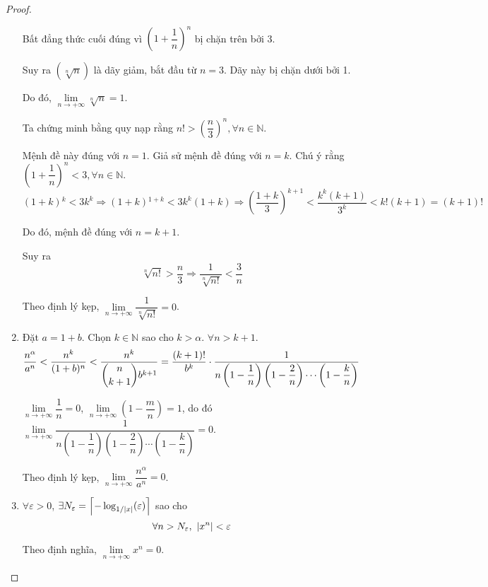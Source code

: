 \documentclass[class=analysis,crop=false]{standalone}
\begin{document}
\begin{proof}
\begin{enumerate}[label = (\roman*)]
            \par Bất đẳng thức cuối đúng vì $\left(1+\dfrac{1}{n}\right)^{n}$ bị chặn trên bởi 3.
            \par Suy ra $(\sqrt[n]{n})$ là dãy giảm, bắt đầu từ $n = 3$. Dãy này bị chặn dưới bởi 1.
            \par Do đó, $\lim\limits_{n\to+\infty}\sqrt[n]{n} = 1$.
            \bigskip
            \par Ta chứng minh bằng quy nạp rằng $n! > \left(\dfrac{n}{3}\right)^{n}, \forall n\in\mathbb{N}$.
            \par Mệnh đề này đúng với $n = 1$. Giả sử mệnh đề đúng với $n = k$. Chú ý rằng $\left(1 + \dfrac{1}{n}\right)^{n} < 3, \forall n\in\mathbb{N}$.
            \[
                (1 + k){}^{k} < 3k^{k}\Rightarrow (1 + k){}^{1 + k} < 3k^{k}(1 + k) \Rightarrow \left(\dfrac{1 + k}{3}\right)^{k+1} < \dfrac{k^{k}(k+1)}{3^{k}} < k!(k+1) = (k+1)!
            \]
            \par Do đó, mệnh đề đúng với $n = k + 1$.
            \bigskip
            \par Suy ra
            \[
                \sqrt[n]{n!} > \dfrac{n}{3} \Longrightarrow \dfrac{1}{\sqrt[n]{n!}} < \dfrac{3}{n}
            \]
            \par Theo định lý kẹp, $\lim\limits_{n\to+\infty}\dfrac{1}{\sqrt[n]{n!}} = 0$.
        \item Đặt $a = 1 + b$. Chọn $k\in\mathbb{N}$ sao cho $k > \alpha$. $\forall n > k + 1$.
            \[
                \dfrac{n^{\alpha}}{a^{n}} < \dfrac{n^{k}}{(1 + b){}^{n}} < \dfrac{n^{k}}{\dbinom{n}{k+1}b^{k+1}} = \dfrac{(k+1)!}{b^{k}}\cdot\dfrac{1}{n\left(1 - \dfrac{1}{n}\right)\left(1 - \dfrac{2}{n}\right)\cdots\left(1 - \dfrac{k}{n}\right)}
            \]
            \par $\lim\limits_{n\to+\infty}\dfrac{1}{n} = 0$, $\lim\limits_{n\to+\infty}\left(1 - \dfrac{m}{n}\right) = 1$, do đó $\lim\limits_{n\to+\infty}\dfrac{1}{n\left(1 - \dfrac{1}{n}\right)\left(1 - \dfrac{2}{n}\right)\cdots\left(1 - \dfrac{k}{n}\right)} = 0$.
            \par Theo định lý kẹp, $\lim\limits_{n\to+\infty}\dfrac{n^{\alpha}}{a^{n}} = 0$.
        \item $\forall\varepsilon > 0$, $\exists N_{\varepsilon} = \left\lceil{-\log_{1/\left\vert{x}\right\vert}(\varepsilon)}\right\rceil$ sao cho
            \[
                \forall n > N_{\varepsilon},\ \left\vert{x^{n}}\right\vert < \varepsilon
            \]
            \par Theo định nghĩa, $\lim\limits_{n\to+\infty}x^{n} = 0$.

\end{enumerate}
\end{proof}
\end{document}
